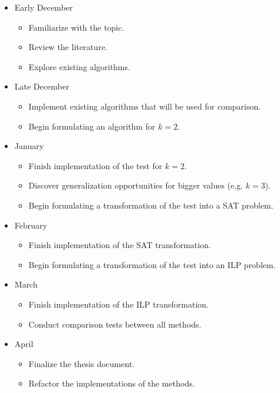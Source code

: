 \documentclass{article}
\begin{document}
\begin{itemize}
    \item Early December
    \begin{itemize}
        \item Familiarize with the topic.
        \item Review the literature.
        \item Explore existing algorithms.
    \end{itemize}
    \item Late December
    \begin{itemize}
        \item Implement existing algorithms that will be used for comparison.
        \item Begin formulating an algorithm for \(k = 2\).
    \end{itemize}
    \item January
    \begin{itemize}
        \item Finish implementation of the test for \(k = 2\).
        \item Discover generalization opportunities for bigger values (e.g. \(k=3\)).
        \item Begin formulating a transformation of the test into a SAT problem.
    \end{itemize}
    \item February
    \begin{itemize}
        \item Finish implementation of the SAT transformation.
        \item Begin formulating a transformation of the test into an ILP problem. 
    \end{itemize}
    \item March
    \begin{itemize}
        \item Finish implementation of the ILP transformation.
        \item Conduct comparison tests between all methods.
    \end{itemize}
    \item April
    \begin{itemize}
        \item Finalize the thesis document.
        \item Refactor the implementations of the methods.
    \end{itemize}
\end{itemize}

\printbibliography[heading=bibintoc]
\end{document}
